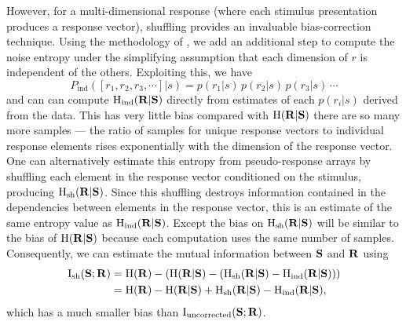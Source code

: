 However, for a multi-dimensional response (where each stimulus presentation produces a response vector), shuffling provides an invaluable bias-correction technique.
Using the methodology of \citet{Montemurro2007}, we add an additional step to compute the noise entropy under the simplifying assumption that each dimension of $r$ is independent of the others.
Exploiting this, we have
\begin{equation}
P_\text{ind}([r_1,r_2,r_3,\cdots]|s) = p(r_1|s)\,p(r_2|s)\,p(r_3|s)\,\cdots
\end{equation}
and can can compute $\operatorname{H}_\text{ind}( \mathbf{R} | \mathbf{S} )$ directly from estimates of each $p(r_i|s)$ derived from the data.
This has very little bias compared with $\operatorname{H}( \mathbf{R} | \mathbf{S} )$ there are so many more samples --- the ratio of samples for unique response vectors to individual response elements rises exponentially with the dimension of the response vector.
One can alternatively estimate this entropy from pseudo-response arrays by shuffling each element in the response vector conditioned on the stimulus, producing $\operatorname{H}_\text{sh}( \mathbf{R} | \mathbf{S} )$.
Since this shuffling destroys information contained in the dependencies between elements in the response vector, this is an estimate of the same entropy value as $\operatorname{H}_\text{ind}( \mathbf{R} | \mathbf{S} )$.
Except the bias on $\operatorname{H}_\text{sh}( \mathbf{R} | \mathbf{S} )$ will be similar to the bias of $\operatorname{H}( \mathbf{R} | \mathbf{S} )$ because each computation uses the same number of samples.
Consequently, we can estimate the mutual information between $\mathbf{S}$ and $\mathbf{R}$ using
\begin{align}
\operatorname{I}_{\text{sh}}(\mathbf{S};\mathbf{R})
   &= \operatorname{H}( \mathbf{R} ) - \left( \operatorname{H}( \mathbf{R} | \mathbf{S} ) - \left( \operatorname{H}_\text{sh}( \mathbf{R} | \mathbf{S} ) - \operatorname{H}_\text{ind}( \mathbf{R} | \mathbf{S} ) \right) \right) \notag
\\ &= \operatorname{H}( \mathbf{R} ) - \operatorname{H}( \mathbf{R} | \mathbf{S} ) + \operatorname{H}_\text{sh}( \mathbf{R} | \mathbf{S} ) - \operatorname{H}_\text{ind}( \mathbf{R} | \mathbf{S} )
,\end{align}
which has a much smaller bias than $\operatorname{I}_{\text{uncorrected}}(\mathbf{S};\mathbf{R})$.

